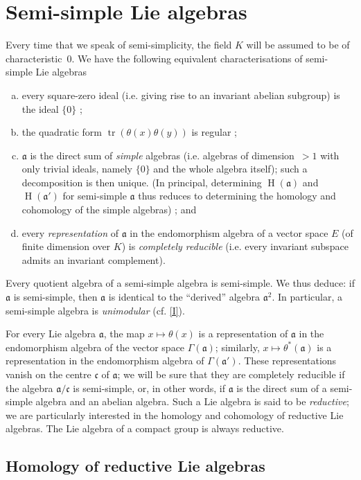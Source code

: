 \documentclass{article}
\newcommand{\fk}{\mathfrak}
\DeclareMathOperator{\HH}{H}
\DeclareMathOperator{\tr}{tr}
\newcommand{\oldpage}[1]{\marginpar{\footnotesize$\Big\vert$ \textit{p.~#1}}}
\begin{document}
\section{Semi-simple Lie algebras}
\label{II.3}

Every time that we speak of semi-simplicity, the field $K$ will be assumed to be of characteristic~$0$.
We have the following equivalent characterisations of semi-simple Lie algebras
\begin{enumerate}[(a)]
  \item every square-zero ideal (i.e. giving rise to an invariant abelian subgroup) is the ideal $\{0\}$ ;
  \item the quadratic form $\tr(\theta(x)\theta(y))$ is regular ;
  \item $\fk{a}$ is the direct sum of \emph{simple} algebras (i.e. algebras of dimension~$>1$ with only trivial ideals, namely $\{0\}$ and the whole algebra itself);
    such a decomposition is then unique.
    (In principal, determining $\HH(\fk{a})$ and $\HH(\fk{a}')$ for semi-simple $\fk{a}$ thus reduces to determining the homology and cohomology of the simple algebras) ; and
\oldpage{47}
  \item every \emph{representation} of $\fk{a}$ in the endomorphism algebra of a vector space $E$ (of finite dimension over $K$) is \emph{completely reducible} (i.e. every invariant subspace admits an invariant complement).
\end{enumerate}

Every quotient algebra of a semi-simple algebra is semi-simple.
We thus deduce:
if $\fk{a}$ is semi-simple, then $\fk{a}$ is identical to the ``derived'' algebra $\fk{a}^2$.
In particular, a semi-simple algebra is \emph{unimodular} (cf. \cref{I}).

For every Lie algebra $\fk{a}$, the map $x\mapsto\theta(x)$ is a representation of $\fk{a}$ in the endomorphism algebra of the vector space $\Gamma(\fk{a})$;
similarly, $x\mapsto\theta^*(\fk{a})$ is a representation in the endomorphism algebra of $\Gamma(\fk{a}')$.
These representations vanish on the centre $\fk{c}$ of $\fk{a}$;
we will be sure that they are completely reducible if the algebra $\fk{a}/\fk{c}$ is semi-simple, or, in other words, if $\fk{a}$ is the direct sum of a semi-simple algebra and an abelian algebra.
Such a Lie algebra is said to be \emph{reductive};
we are particularly interested in the homology and cohomology of reductive Lie algebras.
The Lie algebra of a compact group is always reductive.


\subsection{Homology of reductive Lie algebras}
\label{II.4}
\end{document}
